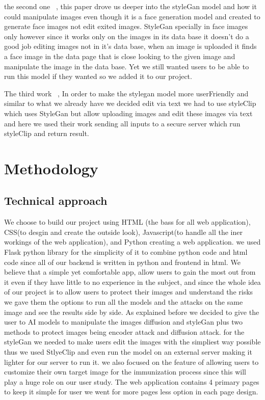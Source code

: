 \documentclass[sigconf]{acmart}
\begin{document}
the second one ~\cite{b}, this paper drove us deeper into the styleGan model and how it could manipulate images even though it is a face generation model and created to generate face images not edit exited images. StyleGan specially in face images only however since it works only on the images in its data base it doesn't do a good job editing images not in it's data base, when an image is uploaded it finds a face image in the data page that is close looking to the given image and manipulate the image in the data base. Yet we still wanted users to be able to run this model if they wanted so we added it to our project.

The third work ~\cite{c}, In order to make the stylegan model more userFriendly and similar to what we already have we decided edit via text we had to use styleClip which uses StyleGan but allow uploading images and edit these images via text and here we used their work sending all inputs to a secure server which run styleClip and return result.

\section{Methodology}

\subsection{Technical approach}

We choose to build our project using HTML (the bass for all web application), CSS(to desgin and create the outside look), Javascript(to handle all the iner workings of the web application), and Python creating a web application. we used Flask python library for the simplicity of it to combine python code and html code since all of our backend is written in python and frontend in html. We believe that a simple yet comfortable app, allow users to gain the most out from it even if they have little to no experience in the subject, and since the whole idea of our project is to allow users to protect their images and understand the risks we gave them the options to run all the models and the attacks on the same image and see the results side by side. As explained before we decided to give the user to AI models to manipulate the images diffusion and styleGan plus two methods to protect images being encoder attack and diffusion attack. for the styleGan we needed to make users edit the images with the simpliest way possible thus we used StlyeClip and even run the model on an external server making it lighter for our server to run it. we also focused on the feature of allowing users to customize their own target image for the immunization process since this will play a huge role on our user study. The web application contains 4 primary pages to keep it simple for user we went for more pages less option in each page design.
\end{document}

